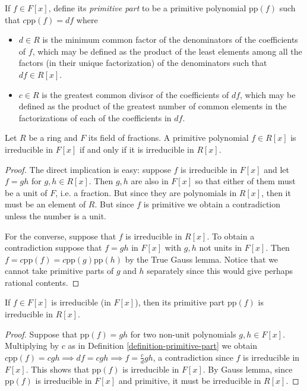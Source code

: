 \begin{definition}
\label{definition-primitive-part}
If $f\in F[x]$, define its {\it primitive part} to be a primitive polynomial
$\text{pp}(f)$ such that $c\text{pp}(f)=df$ where
\begin{itemize}
\item $d\in R$ is the minimum common
factor of the denominators of the coefficients of $f$, which may be defined as
the product of the least elements among all the factors (in their unique
factorization) of the denominators such that $df \in R[x]$.
\item $c\in R$ is the greatest common divisor of the coefficients of $df$, which
may be defined as the product of the greatest number of common elements in the
factorizations of each of the coefficients in $df$.
\end{itemize}
\end{definition}

\begin{lemma}[Gauss]
\label{lemma-Gauss}
Let $R$ be a ring and $F$ its field of fractions. A primitive polynomial $f\in
R[x]$ is irreducible in $F[x]$ if and only if it is irreducible in $R[x]$.
\end{lemma}

\begin{proof}
The direct implication is easy: suppose $f$ is irreducible in $F[x]$ and let
$f=gh$ for $g,h\in R[x]$. Then $g,h$ are also in $F[x]$ so that either of them
must be a unit of $F$, i.e. a fraction. But since they are polynomials in
$R[x]$, then it must be an element of $R$. But since $f$ is primitive we obtain
a contradiction unless the number is a unit.

For the converse, suppose that $f$ is irreducible in $R[x]$. To obtain a 
contradiction suppose that $f=gh$ in $F[x]$ with $g,h$ not units in $F[x]$.
Then $f=c\text{pp}(f)=c\text{pp}(g)\text{pp}(h)$ by the True Gauss lemma. 
Notice that we cannot take primitive parts of $g$ and $h$ separately since this
would give perhaps rational contents.
\end{proof}

\begin{lemma}
\label{lemma-irreducible-in-Fx-implies-primitive-part-irreducible}
If $f\in F[x]$ is irreducible (in $F[x]$), then its primitive part
$\text{pp}(f)$ is irreducible in $R[x]$.
\end{lemma}

\begin{proof}
Suppose that $\text{pp}(f)=gh$ for two non-unit polynomials $g,h\in F[x]$.
Multiplying by $c$ as in Definition \ref{definition-primitive-part} we obtain
$c\text{pp}(f)=cgh \implies df=cgh \implies f=\frac{c}{d}gh$, a contradiction
since $f$ is irreducible in $F[x]$. This shows that
$\text{pp}(f)$ is irreducible in $F[x]$. By Gauss lemma, since $\text{pp}(f)$ is
irreducible in $F[x]$ and primitive, it must be irreducible in $R[x]$.
\end{proof}

